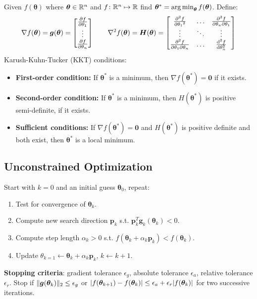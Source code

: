 \documentclass[twocolumn, 8pt]{extarticle}
\begin{document}
Given $f(\bm \theta)$ where $\bm\theta \in \mathbb{R}^n$ and $f \colon \mathbb{R}^n \mapsto \mathbb{R}$ find $\bm\theta^* = \operatorname*{arg\,min} _{\bm\theta} f(\bm\theta)$.
Define:
\[
    \nabla f(\bm\theta) = \bm g(\bm\theta) = \cvec{\pdiff{f}{\theta _1}}{\vdots}{\pdiff{f}{\theta _n}}
    \qquad
    \nabla^2 f(\bm\theta) = \bm H(\bm\theta) = \matthreeb{\pdiffn{2}{f}{\theta_1}}{\dots}{\ppdiff{f}{\theta_n}{\theta_1}}{\vdots}{\ddots}{\vdots}{\ppdiff{f}{\theta_1}{\theta_n}}{\dots}{\diffn{2}{f}{\theta_n}}
\]
Karush-Kuhn-Tucker (KKT) conditions:
\begin{itemize}
    \item \textbf{First-order condition:} If \(\bm\theta^*\) is a minimum, then \(\nabla f(\bm\theta^*) = \bm 0\) if it exists.
    
    \item \textbf{Second-order condition:} If \(\bm\theta^*\) is a minimum, then \(H(\bm\theta^*)\) is positive semi-definite, if
    it exists.
    
    \item \textbf{Sufficient conditions:} If \(\nabla f(\bm\theta^*) = \bm 0\) and \(H(\bm\theta^*)\) is positive
    definite and both exist, then \(\bm\theta^*\) is a local minimum.
\end{itemize}

\subsection{Unconstrained Optimization} %

Start with $k = 0$ and an initial guess $\bm\theta _0$, repeat:
\begin{enumerate}
    \item Test for convergence of $\bm\theta _k$.
    \item Compute new search direction \(\bm p_k\) s.t. \(\bm p_k^T\bm g_k(\bm\theta _k) < 0\).
    \item Compute step length \(\alpha _k > 0\) s.t. \(f(\bm\theta _k + \alpha _k\bm p_k) < f(\bm \theta _k)\).
    \item Update \(\theta _{k = 1} \gets \bm\theta _k + \alpha _k\bm p_k\), \(k \gets k + 1\).
\end{enumerate}

\textbf{Stopping criteria}: gradient tolerance \(\epsilon _g\), absolute tolerance \(\epsilon _a\), relative tolerance \(\epsilon _r\).
Stop if \(\lVert\bm g(\bm\theta _k)\rVert_2 \leq \epsilon _g\) or \(\lvert f(\bm\theta _{k + 1}) - f(\bm\theta _{k})\rvert \leq \epsilon _a + \epsilon _r\lvert f(\bm\theta _k)\rvert\)
for two successive iterations.
\end{document}
